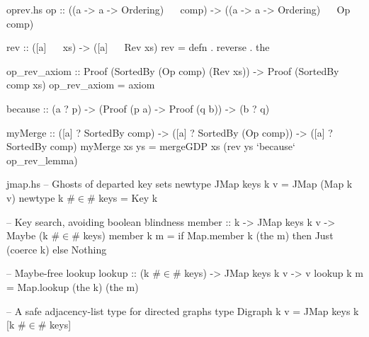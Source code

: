 \documentclass{beamer}
\begin{document}
\begin{frame}{}\end{frame}
\usebackgroundtemplate{}

\begin{filecontents*}{oprev.hs}
op :: ((a -> a -> Ordering) ~~ comp)
   -> ((a -> a -> Ordering) ~~ Op comp)

rev :: ([a] ~~ xs) -> ([a] ~~ Rev xs)
rev = defn . reverse . the

op_rev_axiom :: Proof (SortedBy (Op comp) (Rev xs))
             -> Proof (SortedBy comp xs)
op_rev_axiom = axiom
             
because :: (a ? p) -> (Proof (p a) -> Proof (q b)) -> (b ? q)
             
myMerge :: ([a] ? SortedBy comp)
        -> ([a] ? SortedBy (Op comp))
        -> ([a] ? SortedBy comp)
myMerge xs ys = mergeGDP xs (rev ys `because` op_rev_lemma)
\end{filecontents*}

\begin{filecontents*}{jmap.hs}
-- Ghosts of departed key sets
newtype JMap keys k v = JMap (Map k v)
newtype k #$\in$# keys      = Key k

-- Key search, avoiding boolean blindness
member :: k -> JMap keys k v -> Maybe (k #$\in$# keys)
member k m = if Map.member k (the m)
               then Just (coerce k)
               else Nothing
               
-- Maybe-free lookup
lookup :: (k #$\in$# keys) -> JMap keys k v -> v
lookup k m = Map.lookup (the k) (the m)

-- A safe adjacency-list type for directed graphs
type Digraph k v = JMap keys k [k #$\in$# keys]
\end{filecontents*}
\end{document}

